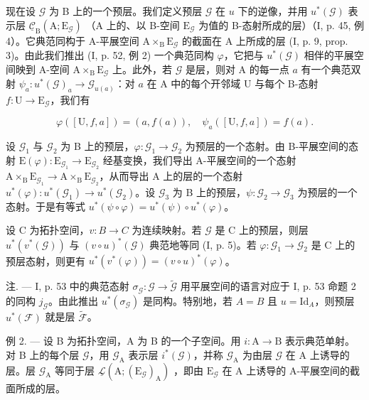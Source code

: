 现在设 \(\mathcal{G}\) 为 B 上的一个预层。我们定义预层 \(\mathcal{G}\) 在 \(u\) 下的逆像，并用 \(u^{*}(\mathcal{G})\) 表示层 \(\underline{\mathcal{C}}_{\mathrm{B}}(\mathrm{A};\mathrm{E}_{\mathcal{G}})\) （A 上的、以 B-空间 \(\mathrm{E}_{\mathcal{G}}\) 为值的 B-态射所成的层）（I, p. 45, 例 4）。它典范同构于 A-平展空间 \(\mathrm{A} \times_{\mathrm{B}} \mathrm{E}_{\mathcal{G}}\) 的截面在 A 上所成的层 (I, p. 9, prop. 3)。由此我们推出 (I, p. 52, 例 2) 一个典范同构 \(\varphi\)，它把与 \(u^{*}(\mathcal{G})\) 相伴的平展空间映到 A-空间 \(\mathrm{A} \times_{\mathrm{B}} \mathrm{E}_{\mathcal{G}}\) 上。此外，若 \(\mathcal{G}\) 是层，则对 A 的每一点 \(a\) 有一个典范双射 \(\psi_{a}: u^{*}(\mathcal{G})_{a} \to \mathcal{G}_{u(a)}\)：对 \(a\) 在 A 中的每个开邻域 U 与每个 B-态射 \(f: \mathrm{U} \to \mathrm{E}_{\mathcal{G}}\)，我们有

\[
\varphi ([ \mathrm{U}, f, a ]) = (a, f (a)), \quad \psi_ {a} ([ \mathrm{U}, f, a ]) = f (a).
\]

设 \(\mathcal{G}_1\) 与 \(\mathcal{G}_2\) 为 B 上的预层，\(\varphi\colon\mathcal{G}_1\to\mathcal{G}_2\) 为预层的一个态射。由 B-平展空间的态射 \(\mathrm{E}(\varphi)\colon\mathrm{E}_{\mathcal{G}_1}\to\mathrm{E}_{\mathcal{G}_2}\) 经基变换，我们导出 A-平展空间的一个态射 \(\mathrm{A}\times_{\mathrm{B}}\mathrm{E}_{\mathcal{G}_1}\to\mathrm{A}\times_{\mathrm{B}}\mathrm{E}_{\mathcal{G}_2}\)，从而导出 A 上的层的一个态射 \(u^{*}(\varphi)\colon u^{*}(\mathcal{G}_{1})\to u^{*}(\mathcal{G}_{2})\)。设 \(\mathcal{G}_3\) 为 B 上的预层，\(\psi\colon\mathcal{G}_2\to\mathcal{G}_3\) 为预层的一个态射。于是有等式 \(u^{*}(\psi\circ\varphi)=u^{*}(\psi)\circ u^{*}(\varphi)\)。

设 C 为拓扑空间，\(v\colon B \to C\) 为连续映射。若 \(\mathcal{G}\) 是 C 上的预层，则层 \(u^{*}(v^{*}(\mathcal{G}))\) 与 \((v \circ u)^{*}(\mathcal{G})\) 典范地等同 (I, p. 5)。若 \(\varphi\colon\mathcal{G}_{1} \to \mathcal{G}_{2}\) 是 C 上的预层态射，则更有 \(u^{*}(v^{*}(\varphi)) = (v \circ u)^{*}(\varphi)\)。

注. --- I, p. 53 中的典范态射 \(\sigma_{\mathcal{G}}\colon\mathcal{G}\to\widetilde{\mathcal{G}}\) 用平展空间的语言对应于 I, p. 53 命题 2 的同构 \(j_{\mathcal{G}}\)。由此推出 \(u^{*}(\sigma_{\mathcal{G}})\) 是同构。特别地，若 \(A = B\) 且 \(u = \mathrm{Id}_A\)，则预层 \(u^{*}(\mathcal{F})\) 就是层 \(\widetilde{\mathcal{F}}\)。

例 2. --- 设 B 为拓扑空间，A 为 B 的一个子空间。用 \(i\colon\mathrm{A}\to\mathrm{B}\) 表示典范单射。对 B 上的每个层 \(\mathcal{G}\)，用 \(\mathcal{G}_{\mathrm{A}}\) 表示层 \(i^{*}(\mathcal{G})\)，并称 \(\mathcal{G}_{\mathrm{A}}\) 为由层 \(\mathcal{G}\) 在 A 上诱导的层。层 \(\mathcal{G}_{\mathrm{A}}\) 等同于层 \(\underline{\mathcal{L}}(\mathrm{A};(\mathrm{E}_{\mathcal{G}})_{\mathrm{A}})\) ，即由 \(\mathrm{E}_{\mathcal{G}}\) 在 A 上诱导的 A-平展空间的截面所成的层。

